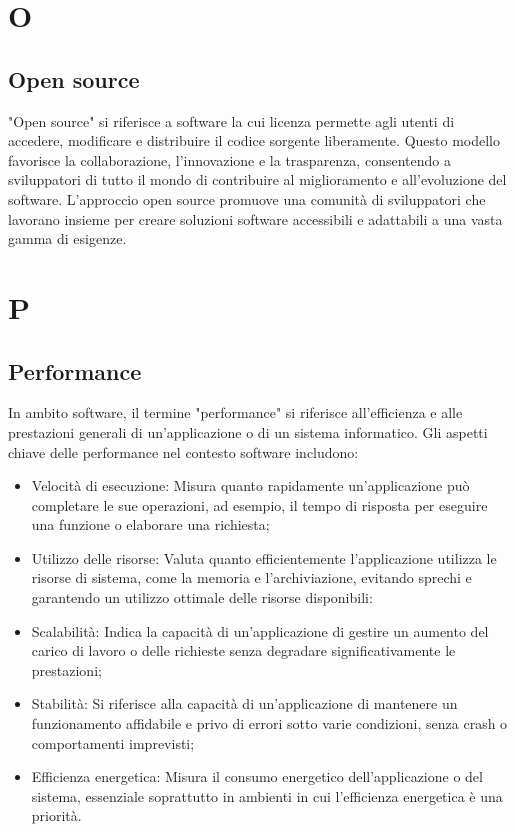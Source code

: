 \documentclass{article}
\begin{document}
\section{O}
\subsection{Open source}
"Open source" si riferisce a software la cui licenza permette agli utenti di accedere, modificare e distribuire il codice sorgente liberamente. Questo modello favorisce la collaborazione, l'innovazione e la trasparenza, consentendo a sviluppatori di tutto il mondo di contribuire al miglioramento e all'evoluzione del software. L'approccio open source promuove una comunità di sviluppatori che lavorano insieme per creare soluzioni software accessibili e adattabili a una vasta gamma di esigenze.

\section{P}
\subsection{Performance}
In ambito software, il termine "performance" si riferisce all'efficienza e alle prestazioni generali di un'applicazione o di un sistema informatico. Gli aspetti chiave delle performance nel contesto software includono:
\begin{itemize}
    \item Velocità di esecuzione: Misura quanto rapidamente un'applicazione può completare le sue operazioni, ad esempio, il tempo di risposta per eseguire una funzione o elaborare una richiesta;
    \item Utilizzo delle risorse: Valuta quanto efficientemente l'applicazione utilizza le risorse di sistema, come la memoria e l'archiviazione, evitando sprechi e garantendo un utilizzo ottimale delle risorse disponibili:
    \item Scalabilità: Indica la capacità di un'applicazione di gestire un aumento del carico di lavoro o delle richieste senza degradare significativamente le prestazioni;
    \item Stabilità: Si riferisce alla capacità di un'applicazione di mantenere un funzionamento affidabile e privo di errori sotto varie condizioni, senza crash o comportamenti imprevisti;
    \item Efficienza energetica: Misura il consumo energetico dell'applicazione o del sistema, essenziale soprattutto in ambienti in cui l'efficienza energetica è una priorità.
\end{itemize}
\end{document}
